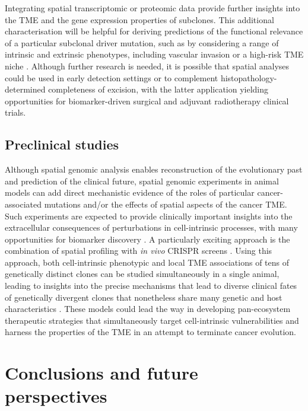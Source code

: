 Integrating spatial transcriptomic or proteomic data provide further insights into the \ac{TME} and the gene expression properties of subclones. This additional characterisation will be helpful for deriving predictions of the functional relevance of a particular subclonal driver mutation, such as by considering a range of intrinsic and extrinsic phenotypes, including vascular invasion or a high-risk \ac{TME} niche . Although further research is needed, it is possible that spatial analyses could be used in early detection settings or to complement histopathology-determined completeness of excision, with the latter application yielding opportunities for biomarker-driven surgical and adjuvant radiotherapy clinical trials.

\subsection*{Preclinical studies}

Although spatial genomic analysis enables reconstruction of the evolutionary past and prediction of the clinical future, spatial genomic experiments in animal models can add direct mechanistic evidence of the roles of particular cancer-associated mutations and/or the effects of spatial aspects of the cancer \ac{TME}. Such experiments are expected to provide clinically important insights into the extracellular consequences of perturbations in cell-intrinsic processes, with many opportunities for biomarker discovery \parencite{Van_Maldegem2021-ta,Janiszewska2019-zq}. A particularly exciting approach is the combination of spatial profiling with \textit{in vivo} CRISPR screens \parencite{Ji2020-gn,Dhainaut2022-nj}. Using this approach, both cell-intrinsic phenotypic and local TME associations of tens of genetically distinct clones can be studied simultaneously in a single animal, leading to insights into the precise mechanisms that lead to diverse clinical fates of genetically divergent clones that nonetheless share many genetic and host characteristics \parencite{Dhainaut2022-nj}. These models could lead the way in developing pan-ecosystem therapeutic strategies that simultaneously target cell-intrinsic vulnerabilities and harness the properties of the \ac{TME} in an attempt to terminate cancer evolution.

\section{Conclusions and future perspectives}

